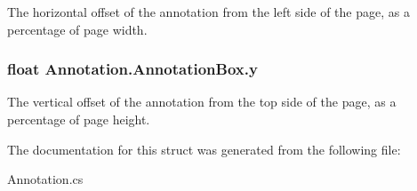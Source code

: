 The horizontal offset of the annotation from the left side of the page, as a percentage of page width. 

\subsubsection[{y}]{\setlength{\rightskip}{0pt plus 5cm}float Annotation.\+Annotation\+Box.\+y}\label{struct_annotation_1_1_annotation_box_abe016787ca879c554211b47dfc6b7965}


The vertical offset of the annotation from the top side of the page, as a percentage of page height. 



The documentation for this struct was generated from the following file\+:\begin{DoxyCompactItemize}
\item 
Annotation.\+cs\end{DoxyCompactItemize}
